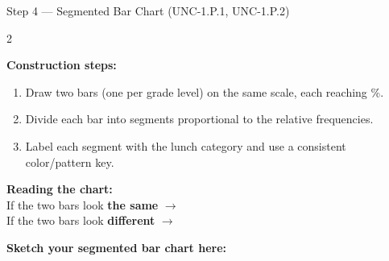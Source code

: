 \documentclass[10pt]{article}
\begin{document}
\vspace{0.1in}

\begin{notesbox}{Step 4 --- Segmented Bar Chart (UNC-1.P.1, UNC-1.P.2)}
\small
\begin{multicols}{2}

\textbf{Construction steps:}
\begin{enumerate}[leftmargin=1.4em, itemsep=3pt]
  \item Draw two bars (one per grade level) on the
        same scale, each reaching \blank{1cm}\%.
  \item Divide each bar into segments proportional
        to the \blank{3cm} relative frequencies.
  \item Label each segment with the lunch category
        and use a consistent color/pattern key.
\end{enumerate}

\vspace{6pt}
\textbf{Reading the chart:}\\
If the two bars look \textbf{the same} $\to$ \blank{3cm}\\
If the two bars look \textbf{different} $\to$ \blank{3cm}

\columnbreak

\vspace{4pt}
\textbf{Sketch your segmented bar chart here:}

\vspace{0.8in}


\end{multicols}

\end{notesbox}

\vspace{0.1in}
\end{document}
